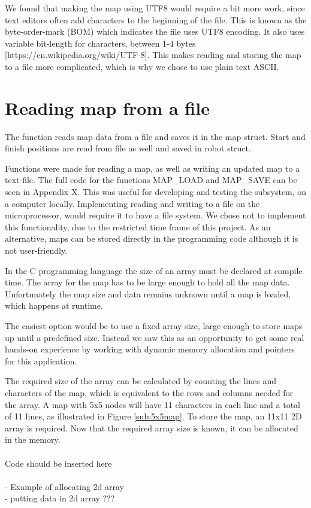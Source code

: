 We found that making the map using UTF8 would require a bit more work, since text editors often add characters to the beginning of the file. 
This is known as the byte-order-mark (BOM) which indicates the file uses UTF8 encoding. 
It also uses variable bit-length for characters, between 1-4 bytes [https://en.wikipedia.org/wiki/UTF-8]. 
This makes reading and storing the map to a file more complicated, which is why we chose to use plain text ASCII.

\section{Reading map from a file}
\label{sec:map_read} %
The function reads map data from a file and saves it in the map struct.
Start and finish positions are read from file as well and saved in robot struct.

Functions were made for reading a map, as well as writing an updated map to a text-file. 
The full code for the functions MAP\_LOAD and MAP\_SAVE can be seen in Appendix X.
This was useful for developing and testing the subsystem, on a computer locally. 
Implementing reading and writing to a file on the microprocessor, would require it to have a file system. 
We chose not to implement this functionality, due to the restricted time frame of this project.
As an alternative, maps can be stored directly in the programming code although it is not user-friendly.

In the C programming language the size of an array must be declared at compile time. 
The array for the map has to be large enough to hold all the map data.
Unfortunately the map size and data remains unknown until a map is loaded, which happens at runtime.

The easiest option would be to use a fixed array size, large enough to store maps up until a predefined size. 
Instead we saw this as an opportunity to get some real hands-on experience by working with dynamic memory allocation and pointers for this application.

The required size of the array can be calculated by counting the lines and characters of the map, which is equivalent to the rows and columns needed for the array. A map with 5x5 nodes will have 11 characters in each line and a total of 11 lines, as illustrated in Figure \ref{sub:5x5map}. To store the map, an 11x11 2D array is required. Now that the required array size is known, it can be allocated in the memory.\\
\\
Code should be inserted here\\
\\
- Example of allocating 2d array\\
- putting data in 2d array ???\\

